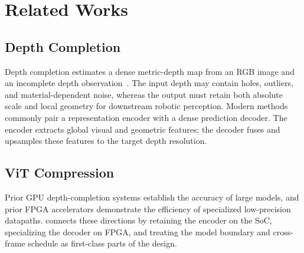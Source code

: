 \section{Related Works}
\label{sec:related}

\subsection{Depth Completion}
\label{sec:related-depth}

Depth completion estimates a dense metric-depth map from an RGB image and an
incomplete depth observation~\cite{uhrig2017sparsity}.  The input depth may
contain holes, outliers, and material-dependent noise, whereas the output must
retain both absolute scale and local geometry for downstream robotic
perception.  Modern methods commonly pair a representation encoder with a
dense prediction decoder.  The encoder extracts global visual and geometric
features; the decoder fuses and upsamples these features to the target depth
resolution.

\subsection{ViT Compression}
\label{sec:related-vit}

Prior GPU depth-completion systems establish the accuracy of large models, and
prior FPGA accelerators demonstrate the efficiency of specialized low-precision
datapaths.  \system{} connects these directions by retaining the encoder on the
SoC, specializing the decoder on FPGA, and treating the model boundary and
cross-frame schedule as first-class parts of the design.
